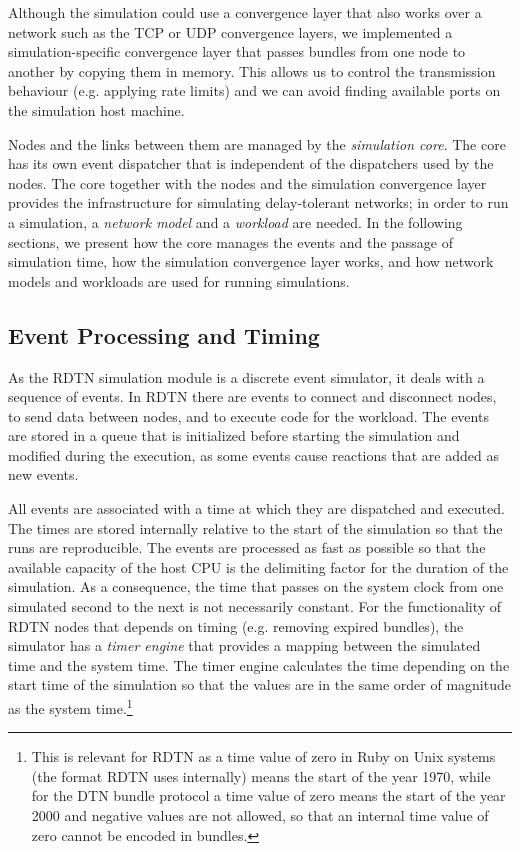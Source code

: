 \documentclass[a4paper]{article}
\begin{document}
Although the simulation could use a convergence layer that also works over a
network such as the TCP or UDP convergence layers, we implemented a
simulation-specific convergence layer that passes bundles from one node to
another by copying them in memory. This allows us to control the transmission
behaviour (e.g. applying rate limits) and we can avoid finding available ports
on the simulation host machine. 

Nodes and the links between them are managed by the {\em simulation core}.  The
core has its own event dispatcher that is independent of the dispatchers used by
the nodes. The core together with the nodes and the simulation convergence layer
provides the infrastructure for simulating delay-tolerant networks; in order to
run a simulation, a {\em network model} and a {\em workload} are needed. In the
following sections, we present how the core manages the events and the passage
of simulation time, how the simulation convergence layer works, and how network
models and workloads are used for running simulations.

\subsection{Event Processing and Timing}\label{sec.sim.events}

As the RDTN simulation module is a discrete event simulator, it deals with a
sequence of events. In RDTN there are events to connect and disconnect nodes, to
send data between nodes, and to execute code for the workload. The events are
stored in a queue that is initialized before starting the simulation and
modified during the execution, as some events cause reactions that are added as
new events.

All events are associated with a time at which they are dispatched and executed.
The times are stored internally relative to the start of the simulation so that
the runs are reproducible. The events are processed as fast as possible so that
the available capacity of the host CPU is the delimiting factor for the duration
of the simulation. As a consequence, the time that passes on the system clock
from one simulated second to the next is not necessarily constant.  For the
functionality of RDTN nodes that depends on timing (e.g. removing expired
bundles), the simulator has a {\em timer engine} that provides a mapping between
the simulated time and the system time.  The timer engine calculates the time
depending on the start time of the simulation so that the values are in the same
order of magnitude as the system time.\footnote{This is relevant for RDTN as a
time value of zero in Ruby on Unix systems (the format RDTN uses internally)
means the start of the year 1970, while for the DTN bundle protocol a time value
of zero means the start of the year 2000 and negative values are not allowed, so
that an internal time value of zero cannot be encoded in bundles.}
\end{document}
